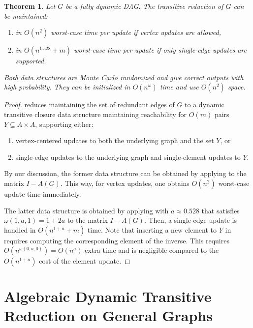 \documentclass[11pt]{article}
\newtheorem{theorem}{Theorem}[section]
\begin{document}
{\begin{theorem}\label{thm:algebraic-dag}
    Let $G$ be a fully dynamic DAG. The transitive reduction of $G$ can be maintained:
    \begin{enumerate}[label=(\arabic*)]
        \item in $O(n^2)$ worst-case time per update if vertex updates are allowed,
        \item in $O(n^{1.528}+m)$ worst-case time per update if only single-edge updates are supported.
    \end{enumerate}
    Both data structures are Monte Carlo randomized and give correct outputs with high probability.
    They can be initialized in $O(n^\omega)$ time and use $O(n^2)$ space.
\end{theorem}
\begin{proof}
 reduces maintaining the set of redundant edges
of $G$ to a dynamic transitive closure
data structure maintaining reachability for $O(m)$ pairs $Y\subseteq A\times A$, supporting
either:
\begin{enumerate}[label=(\arabic*)]
    \item vertex-centered updates to both the underlying graph and the set $Y$, or
    \item single-edge updates to the underlying graph and single-element updates to $Y$.
\end{enumerate}
By our discussion, the former data structure can be obtained by
applying 
to the matrix $I-A(G)$.
This way, for vertex updates, one obtains $O(n^2)$ worst-case update time immediately.

The latter data structure is obtained by applying 
with $a\approx 0.528$ that satisfies $\omega(1,a,1)=1+2a$ to the matrix $I-A(G)$. Then, a single-edge update is handled in $O(n^{1+a}+m)$ time. Note that inserting a new element to $Y$ in  requires
computing the corresponding element of the inverse. This requires $O(n^{\omega(0,a,0)})=O(n^a)$ extra time and is negligible compared to the $O(n^{1+a})$ cost of the element update.
\end{proof}



 \section{Algebraic Dynamic Transitive Reduction on General Graphs}
\label{sec:app_algebraic_general}

}
\end{document}
